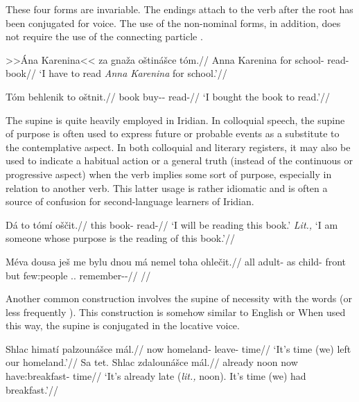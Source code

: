 These four forms are invariable. The endings attach to the verb after the root has been conjugated for voice. The use of the non-nominal forms, in addition, does not require the use of the connecting particle .

\pex
\a\begingl
\gla >>Ána Karenina<< za gnaža oštinášce tóm.//
\glb Anna Karenina for school-\Acc{} read- book//
\glft `I have to read \textit{Anna Karenina} for school.'//
\endgl

\a\begingl
\gla Tóm behlenik to oštnit.//
\glb book buy-\Pv{}-\Pf{}  read-//
\glft `I bought the book to read.'//
\endgl
\xe

The supine is quite heavily employed in Iridian. In colloquial speech, the supine of purpose is often used to express future or probable events as a substitute to the contemplative aspect. In both colloquial and literary registers, it may also be used to indicate a habitual action or a general truth (instead of the continuous or progressive aspect) when the verb implies some sort of purpose, especially in relation to another verb. This latter usage is rather idiomatic and is often a source of confusion for second-language learners of Iridian.

\pex
\begingl
\gla Dá to t\'om\'i oščit.//
\glb \First{}\Sg{} this book-\Gen{} read-//
\glft `I will be reading this book.' \emph{Lit.,} `I am someone whose purpose is the reading of this book.'//
\endgl
\xe

\pex
\begingl
\gla Méva dousa ješ me bylu dnou má nemel toha ohlečit.//
\glb all adult-\Acc{} \Exst{} as child-\Ins{} front but few:people \Dem{}.\Prox{}.\Acc{} remember-\Av{}-\Sup{}//
\glft {}//
\endgl
\xe

Another common construction involves the supine of necessity with the words   (or less frequently ). This construction is somehow similar to English  or  When used this way, the supine is conjugated in the locative voice.

\pex
\begingl
\gla Shlac himatí palzounášce mál.//
\glb now homeland-\Gen{} leave- time//
\glft `It's time (we) left our homeland.'//
\endgl
\xe
\pex
\begingl
\gla Sa tet. Shlac zdalounášce mál.//
\glb already noon now have:breakfast- time//
\glft `It's already late (\emph{lit.,} noon). It's time (we) had breakfast.'//
\endgl
\xe

